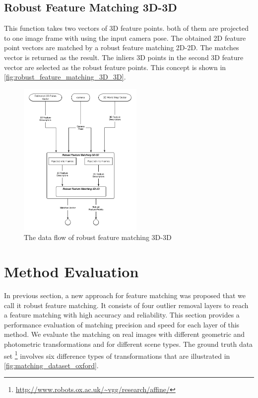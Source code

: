 \subsection {Robust Feature Matching 3D-3D} \label{subsec:robust_feature_matching_3D_3D}
This function takes two vectors of 3D feature points. both of them are projected to one image frame with using the input camera pose. The obtained 2D feature point vectors are matched by a robust feature matching 2D-2D. The matches vector is returned as the result. The inliers 3D points in the second 3D feature vector are selected as the robust feature points. This concept is shown in \autoref{fig:robust_feature_matching_3D_3D}.
\begin{figure}[H]
  \centering
  \includegraphics[width=60mm]{figures/robust_feature_matching_3D_3D}
  \caption{The data flow of robust feature matching 3D-3D}\label{fig:robust_feature_matching_3D_3D}
\end{figure}



\section {Method Evaluation}
In previous section, a new approach for feature matching was proposed that we call it robust feature matching. It consists of four outlier removal layers to reach a feature matching with high accuracy and reliability. This section provides a performance evaluation of matching precision and speed for each layer of this method. We evaluate the matching on real images with different geometric and photometric transformations and for different scene types. The ground truth data set \footnote {\url{http://www.robots.ox.ac.uk/~vgg/research/affine/}} involves six difference types of transformations that are illustrated in \autoref{fig:matching_dataset_oxford}.

